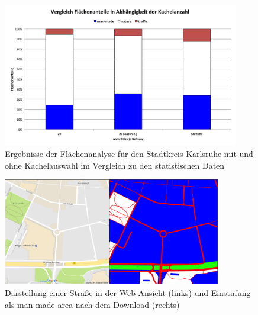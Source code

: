 %
%
\begin{figure}
  \centering
    \includegraphics[width=0.92\textwidth]{images/3_Kachelvergleich_KA_skip.png}
    \caption{Ergebnisse der Flächenanalyse für den Stadtkreis Karlsruhe mit und ohne Kachelauswahl im Vergleich zu den statistischen Daten}
    \label{fig:Kachel_skip_vgl}
\end{figure}
%
%
\begin{figure}
  \centering
    \includegraphics[width=0.85\textwidth]{images/3_google_Einstufung_Nutzung.png}
    \caption{Darstellung einer Straße in der Web-Ansicht (links) und Einstufung als man-made area nach dem Download (rechts)}
    \label{fig:versch_nutz_einstuf}
\end{figure}
%
